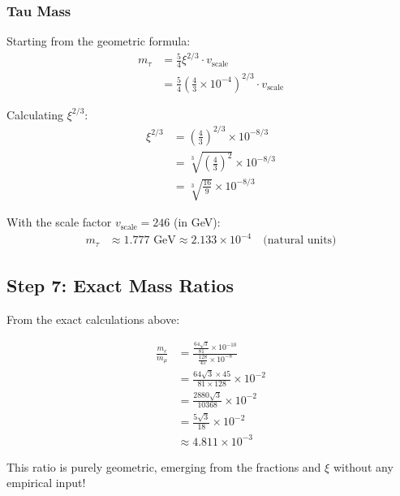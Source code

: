 \documentclass[12pt,a4paper]{article}
\newcommand{\xipar}{\xi}  %
\begin{document}
	\subsubsection{Tau Mass}
	
	\begin{keyresult}
		Starting from the geometric formula:
		\begin{align}
			m_\tau &= \frac{5}{4} \xipar^{2/3} \cdot v_{\text{scale}} \\
			&= \frac{5}{4} \left(\frac{4}{3} \times 10^{-4}\right)^{2/3} \cdot v_{\text{scale}}
		\end{align}
		
		Calculating $\xipar^{2/3}$:
		\begin{align}
			\xipar^{2/3} &= \left(\frac{4}{3}\right)^{2/3} \times 10^{-8/3} \\
			&= \sqrt[3]{\left(\frac{4}{3}\right)^2} \times 10^{-8/3} \\
			&= \sqrt[3]{\frac{16}{9}} \times 10^{-8/3}
		\end{align}
		
		With the scale factor $v_{\text{scale}} = 246$ (in GeV):
		\begin{align}
			m_\tau &\approx 1.777 \text{ GeV} \approx 2.133 \times 10^{-4} \quad \text{(natural units)}
		\end{align}
	\end{keyresult}
	
	\subsection{Step 7: Exact Mass Ratios}
	
	From the exact calculations above:
	
	\begin{keyresult}
		\begin{align}
			\frac{m_e}{m_\mu} &= \frac{\frac{64\sqrt{3}}{81} \times 10^{-10}}{\frac{128}{45} \times 10^{-8}} \\
			&= \frac{64\sqrt{3} \times 45}{81 \times 128} \times 10^{-2} \\
			&= \frac{2880\sqrt{3}}{10368} \times 10^{-2} \\
			&= \frac{5\sqrt{3}}{18} \times 10^{-2} \\
			&\approx 4.811 \times 10^{-3}
		\end{align}
		
		This ratio is purely geometric, emerging from the fractions and $\xipar$ without any empirical input!
	\end{keyresult}
	
\end{document}

